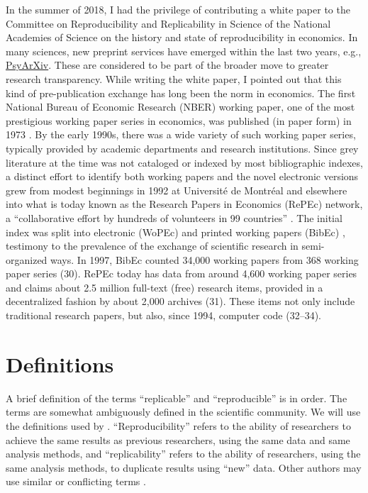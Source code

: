 \documentclass[AEJ]{AEA}
\begin{document}
\begin{cornerbox}
In the summer of 2018, I had the privilege of contributing a white paper to the Committee on Reproducibility and Replicability in Science of the National Academies of Science on the history and state of reproducibility in economics. In many sciences, new preprint services have emerged within the last two years, e.g., \href{https://psyarxiv.com/}{PsyArXiv}. These are considered to be part of the broader move to greater research transparency. While writing the white paper, I pointed out that this kind of pre-publication exchange has long been the norm in economics. The first National Bureau of Economic Research (NBER) working paper, one of the most prestigious working paper series in economics, was published (in paper form) in 1973 \citep{WelchEducationInformationEfficiency1973}. By the early 1990s, there was a wide variety of such working paper series, typically provided by academic departments and research institutions. Since grey literature at the time was not cataloged or indexed by most bibliographic indexes, a distinct effort to identify both working papers and the novel electronic versions grew from modest beginnings in 1992 at Université de Montréal and elsewhere into what is today known as the Research Papers in Economics (RePEc) network, a “collaborative effort by hundreds of volunteers in 99 countries” \citep{RePEcResearchPapers,KrichelEconomicsOpenBibliographic2009,Batiz-Lazobriefbusinesshistory2012}. The initial index was split into electronic (WoPEc) \citep{KrichelWoPEcElectronicWorking1997}  and printed working papers (BibEc) \citep{KrichelEconomicsOpenBibliographic2009,CruzCatalogingEconomicsPreprints2000}, testimony to the prevalence of the exchange of scientific research in semi-organized ways.  In 1997, BibEc counted 34,000 working papers from 368 working paper series (30). RePEc today has data from around 4,600 working paper series and claims about 2.5 million full-text (free) research items, provided in a decentralized fashion by about 2,000 archives (31). These items not only include traditional research papers, but also, since 1994, computer code (32–34). 
\end{cornerbox}

\section{Definitions}
A brief definition of the terms ``replicable'' and ``reproducible'' is in order. The terms are somewhat ambiguously defined in the scientific community. We will use the definitions used by \cite{Bollen2015-vb}. ``Reproducibility''  refers to the ability of researchers to achieve the same results as previous researchers, using the same data and same analysis methods, and ``replicability''  refers to the ability of researchers, using the same analysis methods, to duplicate results using ``new'' data. Other authors may use similar or conflicting terms \citep{Clemens2017-zj}. 
\end{document}
